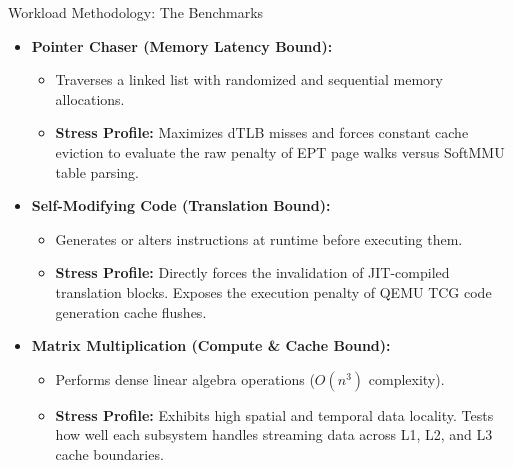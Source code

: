 \documentclass[aspectratio=169]{beamer} %
\begin{document}
 \begin{frame}{Workload Methodology: The Benchmarks}
      \begin{itemize}
          \item \textbf{Pointer Chaser (Memory Latency Bound):}
          \begin{itemize}
              \item Traverses a linked list with randomized and sequential memory allocations.
              \item \textbf{Stress Profile:} Maximizes dTLB misses and forces constant cache eviction to evaluate the raw penalty of EPT page walks versus SoftMMU table parsing.
          \end{itemize}
          
          \vspace{0.3cm}
          \item \textbf{Self-Modifying Code (Translation Bound):}
          \begin{itemize}
              \item Generates or alters instructions at runtime before executing them.
              \item \textbf{Stress Profile:} Directly forces the invalidation of JIT-compiled translation blocks. Exposes the execution penalty of QEMU TCG code generation cache flushes.
          \end{itemize}

          \vspace{0.3cm}
          \item \textbf{Matrix Multiplication (Compute \& Cache Bound):}
          \begin{itemize}
              \item Performs dense linear algebra operations ($O(n^3)$ complexity).
              \item \textbf{Stress Profile:} Exhibits high spatial and temporal data locality. Tests how well each subsystem handles streaming data across L1, L2, and L3 cache boundaries.
          \end{itemize}
      \end{itemize}
  \end{frame}
\end{document}
